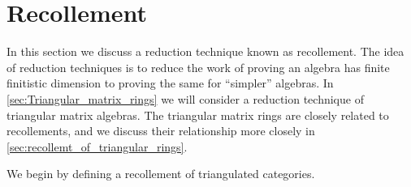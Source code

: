 \section{Recollement}\label{sec:recollement}

In this section we discuss a reduction technique known as recollement. The idea of reduction techniques is to reduce the work of proving an algebra has finite finitistic dimension to proving the same for ``simpler'' algebras. In \cref{sec:Triangular_matrix_rings} we will consider a reduction technique of triangular matrix algebras. The triangular matrix rings are closely related to recollements, and we discuss their relationship more closely in \cref{sec:recollemt_of_triangular_rings}.

We begin by defining a recollement of triangulated categories.


